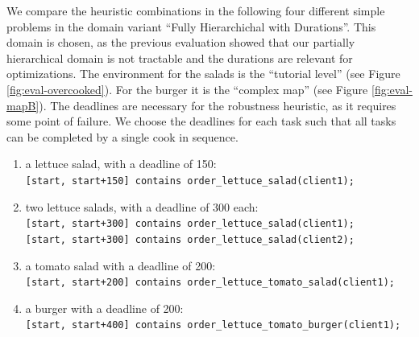 We compare the heuristic combinations in the following four different simple problems in the domain variant ``Fully Hierarchichal with Durations''.
This domain is chosen, as the previous evaluation showed that our partially hierarchical domain is not tractable and the durations are relevant for optimizations.
The environment for the salads is the ``tutorial level'' (see Figure \ref{fig:eval-overcooked}).
For the burger it is the ``complex map'' (see Figure \ref{fig:eval-mapB}).
The deadlines are necessary for the robustness heuristic, as it requires some point of failure.
We choose the deadlines for each task such that all tasks can be completed by a single cook in sequence.
\begin{enumerate}
  \item a lettuce salad, with a deadline of 150:\\ 
    \verb|[start, start+150] contains order_lettuce_salad(client1);|
  \item two lettuce salads, with a deadline of 300 each:\\
    \verb|[start, start+300] contains order_lettuce_salad(client1);|\\
    \verb|[start, start+300] contains order_lettuce_salad(client2);|\\
  \item a tomato salad with a deadline of 200:\\
    \verb|[start, start+200] contains order_lettuce_tomato_salad(client1);|
  \item a burger with a deadline of 200:\\
    \verb|[start, start+400] contains order_lettuce_tomato_burger(client1);|
\end{enumerate}

